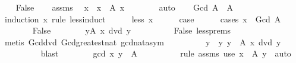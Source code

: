 \begin{isabellebody}
\ \ \isamarkupfalse%
\ False\isanewline
\ \ \isamarkupfalse%
\ assms\ \isamarkupfalse%
\ x\ \ {\isachardoublequoteopen}x\ {\isasymin}\ A{\isachardoublequoteclose}\ {\isachardoublequoteopen}x\ {\isachargreater}{\kern0pt}\ {}{\isachardoublequoteclose}\isanewline
\ \ \ \ \isamarkupfalse%
\ auto\isanewline
\ \ \isamarkupfalse%
\ {\isachardoublequoteopen}Gcd\ A\ {\isasymin}\ A{\isachardoublequoteclose}\isanewline
\ \ \isamarkupfalse%
\ {\isacharparenleft}{\kern0pt}induction\ x\ rule{\isacharcolon}{\kern0pt}\ less{\isacharunderscore}{\kern0pt}induct{\isacharparenright}{\kern0pt}\isanewline
\ \ \ \ \isamarkupfalse%
\ {\isacharparenleft}{\kern0pt}less\ x{\isacharparenright}{\kern0pt}\isanewline
\ \ \ \ \isamarkupfalse%
\ {\isacharquery}{\kern0pt}case\isanewline
\ \ \ \ \isamarkupfalse%
\ {\isacharparenleft}{\kern0pt}cases\ {\isachardoublequoteopen}x\ {\isacharequal}{\kern0pt}\ Gcd\ A{\isachardoublequoteclose}{\isacharparenright}{\kern0pt}\isanewline
\ \ \ \ \ \ \isamarkupfalse%
\ False\isanewline
\ \ \ \ \ \ \isamarkupfalse%
\ {\isachardoublequoteopen}{\isasymexists}y{\isasymin}A{\isachardot}{\kern0pt}\ {\isasymnot}x\ dvd\ y{\isachardoublequoteclose}\isanewline
\ \ \ \ \ \ \ \ \isamarkupfalse%
\ False\ less{\isachardot}{\kern0pt}prems\ \isamarkupfalse%
\ {\isacharparenleft}{\kern0pt}metis\ Gcd{\isacharunderscore}{\kern0pt}dvd\ Gcd{\isacharunderscore}{\kern0pt}greatest{\isacharunderscore}{\kern0pt}nat\ gcd{\isacharunderscore}{\kern0pt}nat{\isachardot}{\kern0pt}asym{\isacharparenright}{\kern0pt}\isanewline
\ \ \ \ \ \ \isamarkupfalse%
\ \isamarkupfalse%
\ y\ \ y{\isacharcolon}{\kern0pt}\ {\isachardoublequoteopen}y\ {\isasymin}\ A{\isachardoublequoteclose}\ {\isachardoublequoteopen}{\isasymnot}x\ dvd\ y{\isachardoublequoteclose}\isanewline
\ \ \ \ \ \ \ \ \isamarkupfalse%
\ blast\isanewline
\ \ \ \ \ \ \isamarkupfalse%
\ {\isachardoublequoteopen}gcd\ x\ y\ {\isasymin}\ A{\isachardoublequoteclose}\isanewline
\ \ \ \ \ \ \ \ \isamarkupfalse%
\ {\isacharparenleft}{\kern0pt}rule\ assms{\isacharparenleft}{\kern0pt}{}{\isacharparenright}{\kern0pt}{\isacharparenright}{\kern0pt}\ {\isacharparenleft}{\kern0pt}use\ {\isacartoucheopen}x\ {\isasymin}\ A{\isacartoucheclose}\ y\ \ auto{\isacharparenright}{\kern0pt}\isanewline

\end{isabellebody}
